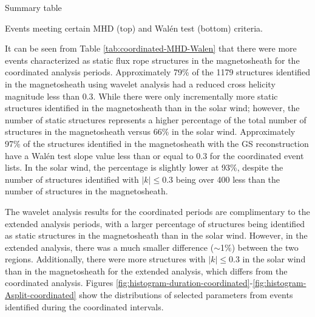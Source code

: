 \begin{table}
    \centering
    \caption{Summary table}
    
    \label{tab:coordinated-summary}
\end{table}

\begin{table}
    \centering
    \caption{Events meeting certain MHD (top) and Wal\'en test (bottom) criteria.}
    
    \label{tab:coordinated-MHD-Walen}
\end{table}

\noindent It can be seen from Table \ref{tab:coordinated-MHD-Walen} that there were more events characterized as static flux rope structures in the magnetosheath for the coordinated analysis periods. Approximately 79\% of the 1179 structures identified in the magnetosheath using wavelet analysis had a reduced cross helicity magnitude less than 0.3. While there were only incrementally more static structures identified in the magnetosheath than in the solar wind; however, the number of static structures represents a higher percentage of the total number of structures in the magnetosheath versus 66\% in the solar wind. Approximately 97\% of the structures identified in the magnetosheath with the GS reconstruction have a Wal\'en test slope value less than or equal to 0.3 for the coordinated event lists. In the solar wind, the percentage is slightly lower at 93\%, despite the number of structures identified with $|k|\leq 0.3$ being over 400 less than the number of structures in the magnetosheath.

The wavelet analysis results for the coordinated periods are complimentary to the extended analysis periods, with a larger percentage of structures being identified as static structures in the magnetosheath than in the solar wind. However, in the extended analysis, there was a much smaller difference ($\sim$1\%) between the two regions. Additionally, there were more structures with $|k|\leq 0.3$ in the solar wind than in the magnetosheath for the extended analysis, which differs from the coordinated analysis. Figures \ref{fig:histogram-duration-coordinated}-\ref{fig:histogram-Asplit-coordinated} show the distributions of selected parameters from events identified during the coordinated intervals.

